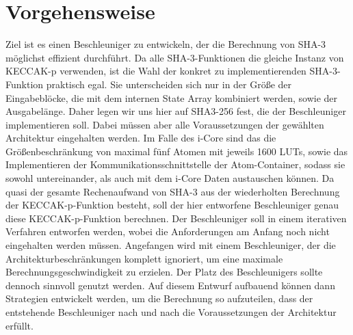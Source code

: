 \section{Vorgehensweise}
Ziel ist es einen Beschleuniger zu entwickeln, der die Berechnung von SHA-3 möglichst effizient durchführt.
Da alle SHA-3-Funktionen die gleiche Instanz von KECCAK-p verwenden, ist die Wahl der konkret zu implementierenden
SHA-3-Funktion praktisch egal. Sie unterscheiden sich nur in der Größe der Eingabeblöcke, die mit dem internen
State Array kombiniert werden, sowie der Ausgabelänge. Daher legen wir uns hier auf SHA3-256 fest, die der Beschleuniger implementieren soll.
Dabei müssen aber alle Voraussetzungen der gewählten Architektur eingehalten werden. Im Falle des i-Core sind
das die Größenbeschränkung von maximal fünf Atomen mit jeweils 1600 LUTs, sowie das Implementieren der
Kommunikationsschnittstelle der Atom-Container, sodass sie sowohl untereinander, als auch mit dem i-Core Daten austauschen können.
Da quasi der gesamte Rechenaufwand von SHA-3 aus der wiederholten Berechnung der KECCAK-p-Funktion besteht,
soll der hier entworfene Beschleuniger genau diese KECCAK-p-Funktion berechnen.
Der Beschleuniger soll in einem iterativen Verfahren entworfen werden, wobei die Anforderungen am Anfang noch
nicht eingehalten werden müssen. Angefangen wird mit einem Beschleuniger,
der die Architekturbeschränkungen komplett ignoriert, um eine maximale Berechnungsgeschwindigkeit zu erzielen.
Der Platz des Beschleunigers sollte dennoch sinnvoll genutzt werden. Auf diesem Entwurf aufbauend können dann
Strategien entwickelt werden, um die Berechnung so aufzuteilen, dass der entstehende Beschleuniger nach und nach die
Voraussetzungen der Architektur erfüllt.
